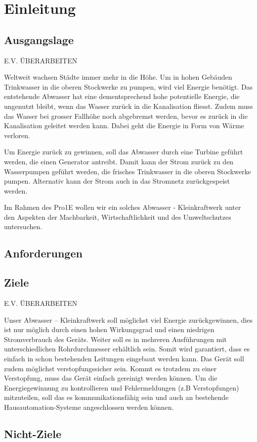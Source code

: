 \section{Einleitung}

\subsection{Ausgangslage}

E.V. ÜBERARBEITEN

Weltweit wachsen Städte immer mehr in die Höhe. Um in hohen Gebäuden Trinkwasser in die oberen Stockwerke zu pumpen, wird viel Energie benötigt. Das entstehende Abwasser hat eine dementsprechend hohe potentielle Energie, die ungenutzt bleibt, wenn das Wasser zurück in die Kanalisation fliesst. Zudem muss das Wasser bei grosser Fallhöhe noch abgebremst werden, bevor es zurück in die Kanalisation geleitet werden kann. Dabei geht die Energie in Form von Wärme verloren. 

Um Energie zurück zu gewinnen, soll das Abwasser durch eine Turbine geführt werden, die einen Generator antreibt. Damit kann der Strom zurück zu den Wasserpumpen geführt werden, die frisches Trinkwasser in die oberen Stockwerke pumpen. Alternativ kann der Strom auch in das Stromnetz zurückgespeist werden. 

Im Rahmen des Pro1E wollen wir ein solches Abwasser - Kleinkraftwerk unter den Aspekten der Machbarkeit, Wirtschaftlichkeit und des Umweltschutzes untersuchen.  

\subsection{Anforderungen}


\subsection{Ziele}

E.V. ÜBERARBEITEN

Unser Abwasser – Kleinkraftwerk soll möglichst viel Energie zurückgewinnen, dies ist nur möglich durch einen hohen Wirkungsgrad und einen niedrigen Stromverbrauch des Geräts. Weiter soll es in mehreren Ausführungen mit unterschiedlichen Rohrdurchmesser erhältlich sein. Somit wird garantiert, dass es einfach in schon bestehenden Leitungen eingebaut werden kann. Das Gerät soll zudem möglichst verstopfungssicher sein. Kommt es trotzdem zu einer Verstopfung, muss das Gerät einfach gereinigt werden können. Um die Energiegewinnung zu kontrollieren und Fehlermeldungen (z.B Verstopfungen) mitzuteilen, soll das es kommunikationsfähig sein und auch an bestehende Hausautomation-Systeme angeschlossen werden können.

\subsection{Nicht-Ziele}


